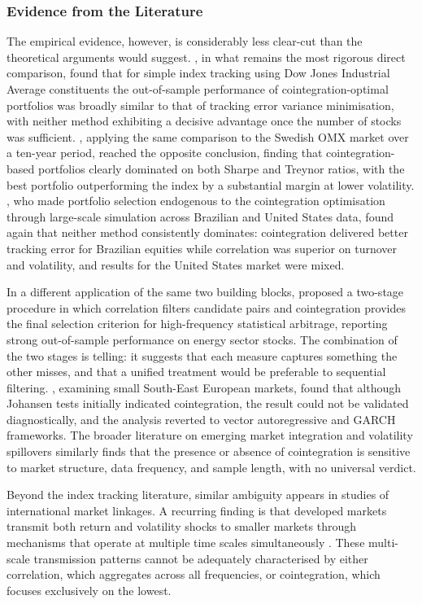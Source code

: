 \documentclass[12pt,a4paper]{article}
\begin{document}
\subsubsection{Evidence from the Literature}

The empirical evidence, however, is considerably less clear-cut than the
theoretical arguments would suggest. \citet{AlexanderDimitriu2005a}, in
what remains the most rigorous direct comparison, found that for simple
index tracking using Dow Jones Industrial Average constituents the
out-of-sample performance of cointegration-optimal portfolios was broadly
similar to that of tracking error variance minimisation, with neither
method exhibiting a decisive advantage once the number of stocks was
sufficient. \citet{Grobys2010}, applying the same comparison to the
Swedish OMX market over a ten-year period, reached the opposite
conclusion, finding that cointegration-based portfolios clearly dominated
on both Sharpe and Treynor ratios, with the best portfolio outperforming
the index by a substantial margin at lower volatility. \citet{SantAnna2016},
who made portfolio selection endogenous to the cointegration optimisation
through large-scale simulation across Brazilian and United States data,
found again that neither method consistently dominates: cointegration
delivered better tracking error for Brazilian equities while correlation
was superior on turnover and volatility, and results for the United
States market were mixed.

In a different application of the same two building blocks,
\citet{Miao2014} proposed a two-stage procedure in which correlation
filters candidate pairs and cointegration provides the final selection
criterion for high-frequency statistical arbitrage, reporting strong
out-of-sample performance on energy sector stocks. The combination of
the two stages is telling: it suggests that each measure captures
something the other misses, and that a unified treatment would be
preferable to sequential filtering. \citet{Arsov2023}, examining small
South-East European markets, found that although Johansen tests
initially indicated cointegration, the result could not be validated
diagnostically, and the analysis reverted to vector autoregressive and
GARCH frameworks. The broader literature on emerging market integration
and volatility spillovers similarly finds that the presence or absence
of cointegration is sensitive to market structure, data frequency, and
sample length, with no universal verdict.

Beyond the index tracking literature, similar ambiguity appears in
studies of international market linkages. A recurring finding is that
developed markets transmit both return and volatility shocks to smaller
markets through mechanisms that operate at multiple time scales
simultaneously \citep{Arsov2023, AlexanderDimitriu2005b}. These
multi-scale transmission patterns cannot be adequately characterised by
either correlation, which aggregates across all frequencies, or
cointegration, which focuses exclusively on the lowest.
\end{document}

